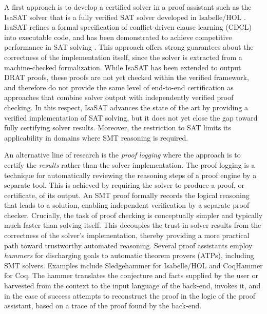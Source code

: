 A first approach is to develop a certified solver in a proof assistant such as the IsaSAT solver \cite{fleury:tel-02963301,fleury:hal-01904647} that is a fully verified SAT solver developed in Isabelle/HOL \cite{isabelle-hol-ref}.
IsaSAT refines a formal specification of conflict-driven clause learning (CDCL) \cite{dpll} into executable code, and has been demonstrated to achieve competitive performance in SAT solving \cite{EDA-challenge}.
This approach offers strong guarantees about the correctness of the implementation itself, since the solver is extracted from a machine-checked formalization.
While IsaSAT has been extended to output DRAT proofs, these proofs are not yet checked within the verified framework, and therefore do not provide the same level of end-to-end certification as approaches that combine solver output with independently verified proof checking.
In this respect, IsaSAT advances the state of the art by providing a verified implementation of SAT solving, but it does not yet close the gap toward fully certifying solver results.
Moreover, the restriction to SAT limits its applicability in domains where SMT reasoning is required.


An alternative line of research is the \emph{proof logging} \cite{proof-logging} where the approach is to certify the \emph{results} rather than the solver implementation.
The proof logging is a technique for automatically reviewing the reasoning steps of a proof engine by a separate tool.
This is achieved by requiring the solver to produce a proof, or certificate, of its output.
An SMT proof formally records the logical reasoning that leads to a solution, enabling independent verification by a separate proof checker.
Crucially, the task of proof checking is conceptually simpler and typically much faster than solving itself.
This decouples the trust in solver results from the correctness of the solver’s implementation, thereby providing a more practical path toward trustworthy automated reasoning.
Several proof assistants employ \emph{hammers} for discharging goals to automatic theorem provers (ATPs), including SMT solvers.
Examples include Sledgehammer \cite{Sledgehammer} for Isabelle/HOL and CoqHammer \cite{coqhammer1,coqhammer2} for Coq.
The hammer translates the conjecture and facts supplied by the user or harvested from the context to the input language of the back-end, invokes it, and in the case of success attempts to reconstruct the proof in the logic of the proof assistant, based on a trace of the proof found by the back-end.


